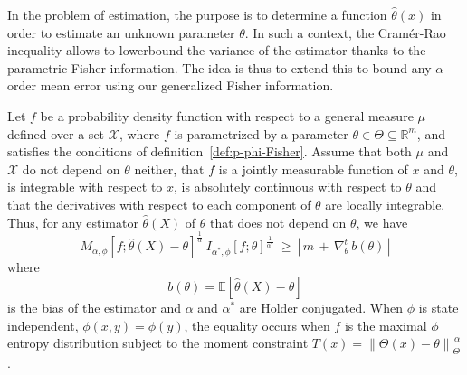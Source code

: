 \documentclass[entropy,article,submit,moreauthors,pdftex]{Definitions/mdpi}
\def\Rset{\mathbb{R}}%
\def\X{\mathcal{X}}%
\newcommand{\Esp}[1]{\mathbb{E}\left[ #1 \right]}%
\begin{document}
In  the  problem  of  estimation,  the   purpose  is  to  determine  a  function
$\hat{\theta}(x)$ in order to estimate an  unknown parameter $\theta$. In such a
context, the  Cram\'er-Rao inequality allows  to lowerbound the variance  of the
estimator thanks  to the  parametric Fisher  information.  The  idea is  thus to
extend this to bound any $\alpha$  order mean error using our generalized Fisher
information.
%
\begin{Proposition}
\label{prop:p-phi-CR}
  Let $f$  be a probability density  function with respect to  a general measure
  $\mu$  defined over  a set  $\X$,  where $f$  is parametrized  by a  parameter
  $\theta  \in  \Theta  \subseteq  \Rset^m$, and  satisfies  the  conditions  of
  definition~\ref{def:p-phi-Fisher}.   Assume that  both $\mu$  and $\X$  do not
  depend on $\theta$  neither, that $f$ is a jointly  measurable function of $x$
  and $\theta$, is integrable with respect to $x$, is absolutely continuous with
  respect to $\theta$ and that the derivatives with respect to each component of
  $\theta$    are    locally    integrable.     Thus,    for    any    estimator
  $\widehat{\theta}(X)$ of $\theta$ that does not depend on $\theta$, we have
  \begin{equation}\label{eq:phi-CR}
  M_{\alpha,\phi} \! \left[ f ; \widehat{\theta}(X) - \theta
    \right]^{\frac{1}{\alpha}} \:
  I_{\alpha^*\!,\phi}[f;\theta]^{\frac{1}{\alpha^*}} \: \ge \: \left| \, m \, +
  \, \nabla_\theta^t \, b(\theta) \, \right|
  \end{equation}
  where
  \begin{equation}
  b(\theta) = \Esp{\widehat{\theta}(X) - \theta}
  \end{equation}
  is  the  bias  of  the  estimator  and  $\alpha$  and  $\alpha^*$  are  Holder
  conjugated.   When $\phi$  is state  independent, $\phi(x,y)  = \phi(y)$,  the
  equality occurs when $f$ is the maximal $\phi$ entropy distribution subject to
  the moment constraint $T(x) = \left\| \Theta(x) - \theta \right\|_{\Theta}^{\,
    \alpha}$.
\end{Proposition}
%
\end{document}
